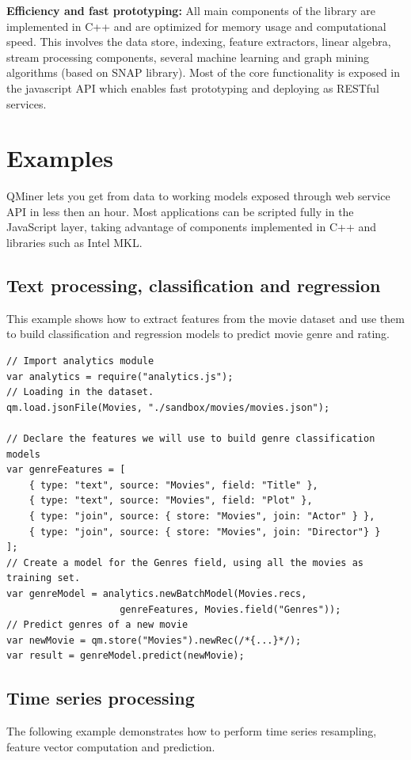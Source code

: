 \documentclass{article} %
\begin{document}
\textbf{Efficiency and fast prototyping:} All main components of the library are implemented in C++ and are optimized for memory usage and computational speed. This involves
the data store, indexing, feature extractors, linear algebra, stream processing components, several machine learning and graph mining algorithms (based on SNAP library). Most of the
core functionality is exposed in the javascript API which enables fast prototyping and deploying as RESTful services.


\section{Examples}
QMiner lets you get from data to working models exposed through web service API in less then an hour. Most applications can be scripted fully in the JavaScript layer, taking advantage of components implemented in C++ and libraries such as Intel MKL.


\subsection{Text processing, classification and regression}

This example shows how to extract features from the movie dataset and use them to build classification and regression models to predict movie genre and rating.

\begin{lstlisting}[caption={Text mining: storage, feature extraction, classification and regression}] 	
// Import analytics module
var analytics = require("analytics.js");
// Loading in the dataset.
qm.load.jsonFile(Movies, "./sandbox/movies/movies.json");
 	
// Declare the features we will use to build genre classification models
var genreFeatures = [
    { type: "text", source: "Movies", field: "Title" },
    { type: "text", source: "Movies", field: "Plot" },
    { type: "join", source: { store: "Movies", join: "Actor" } },
    { type: "join", source: { store: "Movies", join: "Director"} }
];
// Create a model for the Genres field, using all the movies as training set.
var genreModel = analytics.newBatchModel(Movies.recs,
                    genreFeatures, Movies.field("Genres"));
// Predict genres of a new movie
var newMovie = qm.store("Movies").newRec(/*{...}*/);
var result = genreModel.predict(newMovie);
\end{lstlisting}



\subsection{Time series processing}
The following example demonstrates how to perform time series resampling, feature vector computation and prediction.
\end{document}
